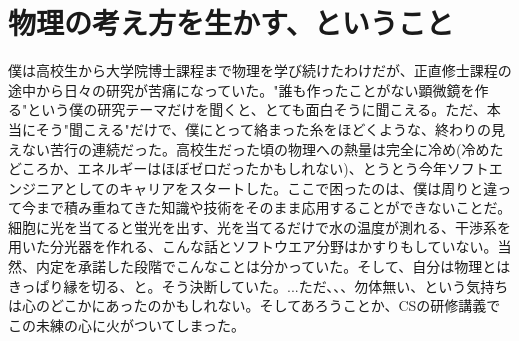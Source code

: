 \documentclass{ltjsarticle}
\begin{document}
\section{物理の考え方を生かす、ということ}
僕は高校生から大学院博士課程まで物理を学び続けたわけだが、正直修士課程の途中から日々の研究が苦痛になっていた。"誰も作ったことがない顕微鏡を作る"という僕の研究テーマだけを聞くと、とても面白そうに聞こえる。ただ、本当にそう"聞こえる"だけで、僕にとって絡まった糸をほどくような、終わりの見えない苦行の連続だった。高校生だった頃の物理への熱量は完全に冷め(冷めたどころか、エネルギーはほぼゼロだったかもしれない)、とうとう今年ソフトエンジニアとしてのキャリアをスタートした。ここで困ったのは、僕は周りと違って今まで積み重ねてきた知識や技術をそのまま応用することができないことだ。細胞に光を当てると蛍光を出す、光を当てるだけで水の温度が測れる、干渉系を用いた分光器を作れる、こんな話とソフトウエア分野はかすりもしていない。当然、内定を承諾した段階でこんなことは分かっていた。そして、自分は物理とはきっぱり縁を切る、と。そう決断していた。...ただ、、、勿体無い、という気持ちは心のどこかにあったのかもしれない。そしてあろうことか、CSの研修講義でこの未練の心に火がついてしまった。
\end{document}
